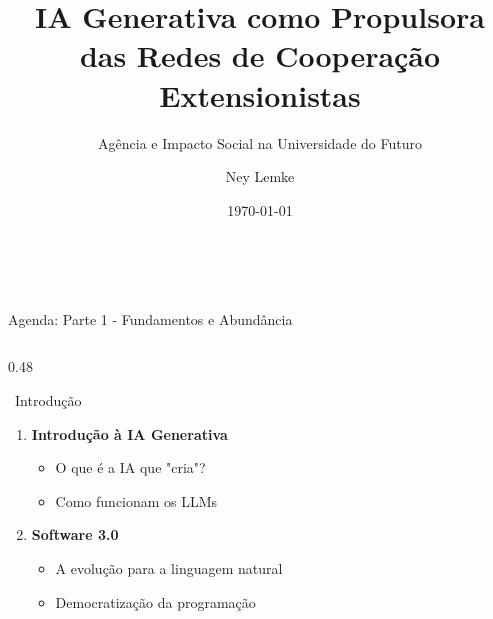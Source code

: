 \documentclass[aspectratio=169,12pt]{beamer}
\title[IA \& Extensão]{IA Generativa como Propulsora das Redes de Cooperação Extensionistas}
\subtitle{Agência e Impacto Social na Universidade do Futuro}
\author{Ney Lemke}
\institute{Unesp}
\date{\today}
\begin{document}
\begin{frame}
    \titlepage
    \begin{center}
        \textcolor{accent}{\faRobot\, \faHandsHelping\, \faGraduationCap}
    \end{center}
\end{frame}


\begin{frame}[shrink]{Agenda: Parte 1 - Fundamentos e Abundância}
    \begin{columns}[T]
        \begin{column}{0.48\textwidth}
            \begin{block}{\faListOl\, Introdução}
                \begin{enumerate}
                    \item \textbf{Introdução à IA Generativa}
                    \begin{itemize}
                        \item O que é a IA que "cria"?
                        \item Como funcionam os LLMs
                    \end{itemize}

                    \item \textbf{Software 3.0}
                    \begin{itemize}
                        \item A evolução para a linguagem natural
                        \item Democratização da programação
                    \end{itemize}
                \end{enumerate}
            \end{block}
        \end{column}


\end{columns}
\end{frame}
\end{document}

